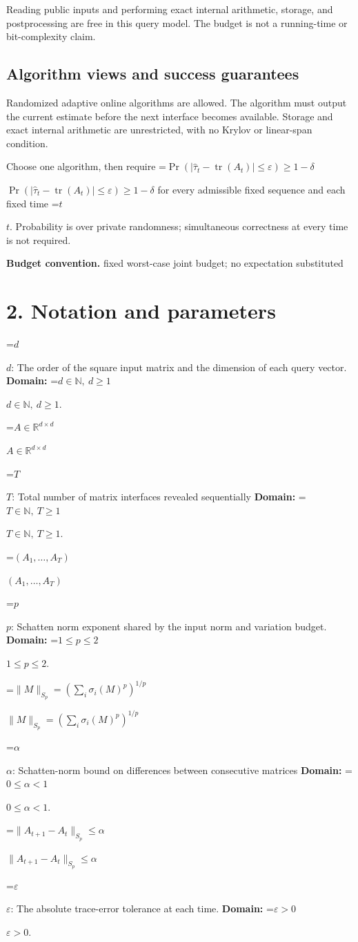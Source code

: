 \documentclass[10pt,a4paper]{article}
\newcommand{\AtlasMath}[1]{\par\begingroup\centering\setbox0=\hbox{$\displaystyle #1$}\ifdim\wd0>1.4\linewidth\typeout{ATLAS WIDE FORMULA: \the\wd0}\fi\ifdim\wd0>\linewidth\resizebox{\linewidth}{!}{\box0}\else\box0\fi\par\endgroup}
\newcommand{\AtlasInlineMath}[1]{\begingroup\setbox0=\hbox{$#1$}\ifdim\wd0>.4\linewidth\endgroup\AtlasMath{#1}\else\endgroup$#1$\fi}
\begin{document}
Reading public inputs and performing exact internal arithmetic, storage, and postprocessing are free in this query model. The budget is not a running-time or bit-complexity claim.

\subsection{Algorithm views and success guarantees}
Randomized adaptive online algorithms are allowed. The algorithm must output the current estimate before the next interface becomes available. Storage and exact internal arithmetic are unrestricted, with no Krylov or linear-span condition.

Choose one algorithm, then require \AtlasInlineMath{\Pr(|\widehat\tau_t-\operatorname{tr}(A_t)|\le\varepsilon)\ge1-\delta} for every admissible fixed sequence and each fixed time \AtlasInlineMath{t}. Probability is over private randomness; simultaneous correctness at every time is not required.

\textbf{Budget convention.} fixed worst-case joint budget; no expectation substituted

\section{2. Notation and parameters}
\AtlasInlineMath{d}: The order of the square input matrix and the dimension of each query vector. \textbf{Domain:} \AtlasInlineMath{d\in\mathbb N,\ d\ge1}.

\AtlasInlineMath{A\in\mathbb R^{d\times d}}

\AtlasInlineMath{T}: Total number of matrix interfaces revealed sequentially \textbf{Domain:} \AtlasInlineMath{T\in\mathbb N,\ T\ge1}.

\AtlasInlineMath{(A_1,\ldots,A_T)}

\AtlasInlineMath{p}: Schatten norm exponent shared by the input norm and variation budget. \textbf{Domain:} \AtlasInlineMath{1\le p\le2}.

\AtlasInlineMath{\|M\|_{S_p}=(\sum_i\sigma_i(M)^p)^{1/p}}

\AtlasInlineMath{\alpha}: Schatten-norm bound on differences between consecutive matrices \textbf{Domain:} \AtlasInlineMath{0\le\alpha<1}.

\AtlasInlineMath{\|A_{t+1}-A_t\|_{S_p}\le\alpha}

\AtlasInlineMath{\varepsilon}: The absolute trace-error tolerance at each time. \textbf{Domain:} \AtlasInlineMath{\varepsilon>0}.
\end{document}
